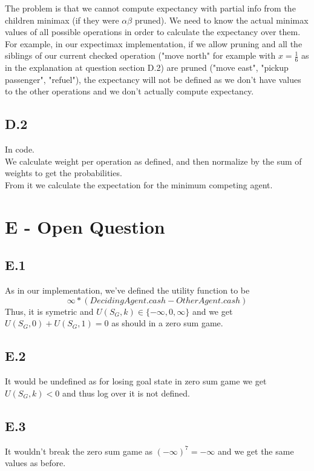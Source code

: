 \documentclass[12pt]{article}
\begin{document}
The problem is that we cannot compute expectancy with partial info from the children minimax (if they were $\alpha\beta$ pruned). We need to know the actual minimax values of all possible operations in order to calculate the expectancy over them.\\
For example, in our expectimax implementation, if we allow pruning and all the siblings of our current checked operation ("move north" for example with $x=\frac{1}{6}$ as in the explanation at question section D.2) are pruned ("move east", "pickup passenger", "refuel"), the expectancy will not be defined as we don't have values to the other operations and we don't actually compute expectancy.\\

\subsection*{D.2}
In code.\\
We calculate weight per operation as defined, and then normalize by the sum of weights to get the probabilities.\\
From it we calculate the expectation for the minimum competing agent.

\section*{E - Open Question}

\subsection*{E.1}

As in our implementation, we've defined the utility function to be $$\infty *(DecidingAgent.cash - OtherAgent.cash)$$
Thus, it is symetric and $U(S_G,k)\in \{-\infty,0,\infty\}$ and we get $U(S_G,0) + U(S_G,1) = 0$ as should in a zero sum game. 

\subsection*{E.2}

It would be undefined as for losing goal state in zero sum game we get $U(S_G,k)<0$ and thus log over it is not defined.

\subsection*{E.3}

It wouldn't break the zero sum game as $(-\infty)^7 = -\infty$ and we get the same values as before.
\end{document}

